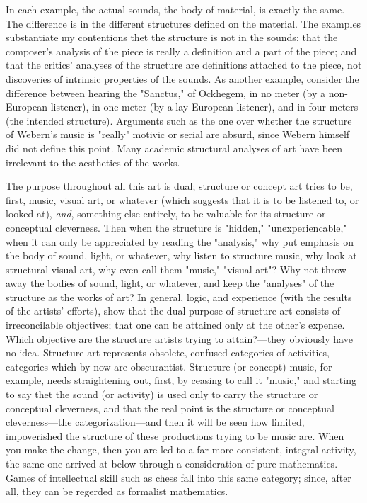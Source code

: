 In each example, the actual sounds, the body of material, is exactly the same. 
The difference is in the different structures defined on the material. The examples 
substantiate my contentions thet the structure is not in the sounds; that the composer's 
analysis of the piece is really a definition and a part of the piece; and that the 
critics' analyses of the structure are definitions attached to the piece, not discoveries 
of intrinsic properties of the sounds. As another example, consider the difference 
between hearing the "Sanctus,"  of Ockhegem, in no meter (by 
a non-European listener), in one meter (by a lay European listener), and in four 
meters (the intended structure). Arguments such as the one over whether the structure 
of Webern's music is "really" motivic or serial are absurd, since Webern himself did not 
define this point. Many academic structural analyses of art have been irrelevant 
to the aesthetics of the works. 

The purpose throughout all this art is dual; structure or concept art tries to be, 
first, music, visual art, or whatever (which suggests that it is to be listened to, or 
looked at), \emph{and}, something else entirely, to be valuable for its structure or conceptual 
cleverness. Then when the structure is "hidden," "unexperiencable," when it can only be 
appreciated by reading the "analysis," why put emphasis on the body of sound, light, or 
whatever, why listen to structure music, why look at structural visual art, why even call 
them "music," "visual art"? Why not throw away the bodies of sound, light, or whatever, 
and keep the "analyses" of the structure as the works of art? In general, logic, and 
experience (with the results of the artists' efforts), show that the dual purpose of 
structure art consists of irreconcilable objectives; that one can be attained only at the 
other's expense. Which objective are the structure artists trying to attain?---they 
obviously have no idea. Structure art represents obsolete, confused categories of 
activities, categories which by now are obscurantist. Structure (or concept) music, 
for example, needs straightening out, first, by ceasing to call it "music," and starting 
to say thet the sound (or activity) is used only to carry the structure or conceptual 
cleverness, and that the real point is the structure or conceptual cleverness---the 
categorization---and then it will be seen how limited, impoverished the structure of 
these productions trying to be music are. When you make the change, then you are led 
to a far more consistent, integral activity, the same one arrived at below through 
a consideration of pure mathematics. Games of intellectual skill such as chess fall 
into this same category; since, after all, they can be regerded as formalist mathematics. 

